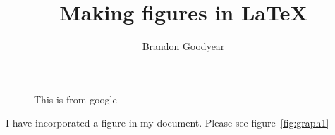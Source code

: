 \documentclass{article}
\begin{document}
\title{Making figures in \LaTeX}
\author{Brandon Goodyear}
\maketitle

\begin{figure}[!htbp]%
\begin{center}
\quad

\quad
{}

\caption{This is from google}
\label{fig:graph}
\end{center}
\end{figure}
I have incorporated a figure in my document. Please see figure\ \ref{fig:graph1}
\end{document}
